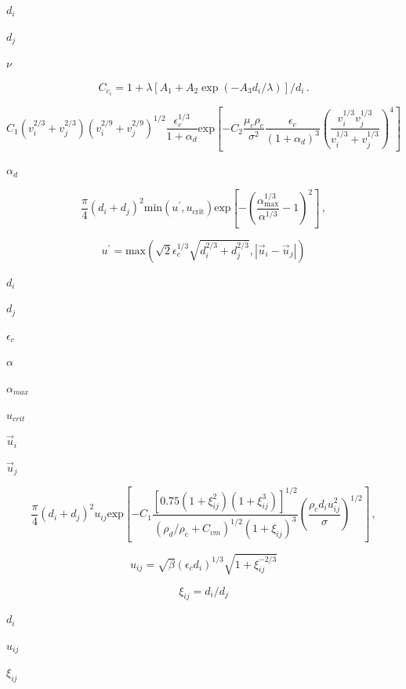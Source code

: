 \documentclass{article}
\begin{document}
$        d_i      $
\pagebreak

$        d_j      $
\pagebreak

$        \nu      $
\pagebreak

\[
    C_{c_i} = 1 + \lambda [A_1 + A_2 \exp(-A_3 d_i/\lambda)]/d_i\,.
\]
\pagebreak

\[
    C_1 (v_i^{2/3} + v_j^{2/3}) (v_i^{2/9} + v_j^{2/9})^{1/2}
    \frac{\epsilon_c^{1/3}}{1 + \alpha_d}
    \text{exp}
    \left[
      - C_2 \frac{\mu_c \rho_c}{\sigma^2}
        \frac{\epsilon_c}{(1 + \alpha_d)^{3}}
        \left(
            \frac{v_i^{1/3} v_j^{1/3}}{v_i^{1/3} + v_j^{1/3}}
        \right)^{4}
    \right]
\]
\pagebreak

$        \alpha_d    $
\pagebreak

\[
    \frac{\pi}{4} (d_i + d_j)^2 \mathrm{min}(u^{\prime}, u_{\mathrm{crit}})
    \mathrm{exp}
    \left[
      - \left(\frac{\alpha_{\mathrm{max}}^{1/3}}{\alpha^{1/3}} - 1\right)^2
    \right]\,,
\]
\pagebreak

\[
    u^{\prime}
  =
    \mathrm{max}
    \left(
        \sqrt{2} \epsilon_c^{1/3} \sqrt{d_i^{2/3} + d_j^{2/3}},
        |\vec{u}_i - \vec{u}_j|
    \right)
\]
\pagebreak

$        d_i          $
\pagebreak

$        d_j          $
\pagebreak

$        \epsilon_c   $
\pagebreak

$        \alpha       $
\pagebreak

$        \alpha_{max} $
\pagebreak

$        u_{crit}     $
\pagebreak

$        \vec{u}_i    $
\pagebreak

$        \vec{u}_j    $
\pagebreak

\[
    \frac{\pi}{4} (d_i + d_j)^2 u_{ij}
    \mathrm{exp}
    \left[
      - C_1
        \frac
        {[0.75(1 + \xi_{ij}^2)(1 + \xi_{ij}^3)]^{1/2}}
        {(\rho_d/\rho_c + C_{vm})^{1/2} (1 + \xi_{ij})^3}
        \left(\frac{\rho_c d_i u_{ij}^2}{\sigma}\right)^{1/2}
    \right]\,,
\]
\pagebreak

\[
    u_{ij} = \sqrt{\beta} (\epsilon_c d_i)^{1/3} \sqrt{1 + \xi_{ij}^{-2/3}}
\]
\pagebreak

\[
    \xi_{ij} = d_i/d_j
\]
\pagebreak

$        d_i         $
\pagebreak

$        u_{ij}      $
\pagebreak

$        \xi_{ij}    $
\pagebreak
\end{document}
